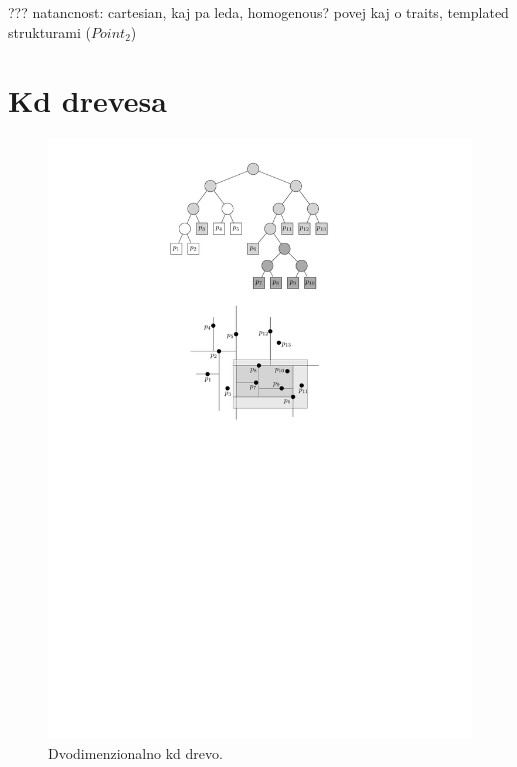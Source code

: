 \documentclass[a4paper, 12pt]{book}
\begin{document}
??? 
natancnost: cartesian, kaj pa leda, homogenous?
povej kaj o traits, templated strukturami ($Point_2$) 

\section{Kd drevesa}

\begin{figure}		
\centerline{\includegraphics[scale=1.2]{pics/kdTree4.pdf}}		
\caption{Dvodimenzionalno kd drevo.}		
\label{kd-primer}		
\end{figure}
\end{document}
